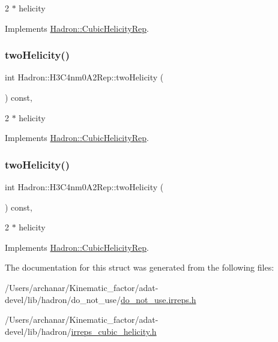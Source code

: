 2 $\ast$ helicity 

Implements \mbox{\hyperlink{structHadron_1_1CubicHelicityRep_af507aa56fc2747eacc8cb6c96db31ecc}{Hadron\+::\+Cubic\+Helicity\+Rep}}.

\mbox{\label{structHadron_1_1H3C4nm0A2Rep_a84b0324c5ce0fc4024042887f259aa7d}} 
\subsubsection{\texorpdfstring{twoHelicity()}{twoHelicity()}\hspace{0.1cm}{\footnotesize\ttfamily [2/3]}}
{\footnotesize\ttfamily int Hadron\+::\+H3\+C4nm0\+A2\+Rep\+::two\+Helicity (\begin{DoxyParamCaption}{ }\end{DoxyParamCaption}) const\hspace{0.3cm}{\ttfamily [inline]}, {\ttfamily [virtual]}}

2 $\ast$ helicity 

Implements \mbox{\hyperlink{structHadron_1_1CubicHelicityRep_af507aa56fc2747eacc8cb6c96db31ecc}{Hadron\+::\+Cubic\+Helicity\+Rep}}.

\mbox{\label{structHadron_1_1H3C4nm0A2Rep_a84b0324c5ce0fc4024042887f259aa7d}} 
\subsubsection{\texorpdfstring{twoHelicity()}{twoHelicity()}\hspace{0.1cm}{\footnotesize\ttfamily [3/3]}}
{\footnotesize\ttfamily int Hadron\+::\+H3\+C4nm0\+A2\+Rep\+::two\+Helicity (\begin{DoxyParamCaption}{ }\end{DoxyParamCaption}) const\hspace{0.3cm}{\ttfamily [inline]}, {\ttfamily [virtual]}}

2 $\ast$ helicity 

Implements \mbox{\hyperlink{structHadron_1_1CubicHelicityRep_af507aa56fc2747eacc8cb6c96db31ecc}{Hadron\+::\+Cubic\+Helicity\+Rep}}.



The documentation for this struct was generated from the following files\+:\begin{DoxyCompactItemize}
\item 
/\+Users/archanar/\+Kinematic\+\_\+factor/adat-\/devel/lib/hadron/do\+\_\+not\+\_\+use/\mbox{\hyperlink{adat-devel_2lib_2hadron_2do__not__use_2do__not__use_8irreps_8h}{do\+\_\+not\+\_\+use.\+irreps.\+h}}\item 
/\+Users/archanar/\+Kinematic\+\_\+factor/adat-\/devel/lib/hadron/\mbox{\hyperlink{adat-devel_2lib_2hadron_2irreps__cubic__helicity_8h}{irreps\+\_\+cubic\+\_\+helicity.\+h}}\end{DoxyCompactItemize}
